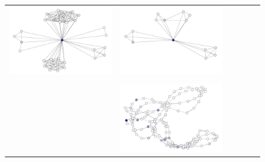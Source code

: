 \begin{figure}[tbhp]
\begin{center}
\begin{tabular}{cccccc}
			{\includegraphics[width=\imgwidth, align=c, trim={0 0 0 0}, clip]{collab/56_96_32nodes_0_0.pdf}} &
			{\includegraphics[width=\imgwidth, align=c, trim={0 0 0 0}, clip]{collab/56_96_14nodes_0_0_pooled.pdf}} \\ \\
			\rotatebox[origin=c]{90}{\small \proteins$_{25}$} &
			{\includegraphics[width=\imgwidth, align=c, trim={0 0 0 0}, clip]{proteins/46_437_134nodes_0_0_global.pdf}} &

\end{tabular}
\end{center}
\end{figure}
